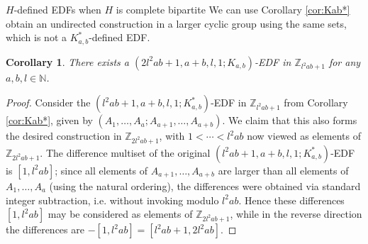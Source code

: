 \documentclass[12pt, a4paper]{article}
\newtheorem{corollary}[theorem]{Corollary}
\theoremstyle{definition}
\begin{document}
\begin{section}{$H$-defined EDFs when $H$ is complete bipartite}
We can use Corollary \ref{cor:Kab*} obtain an undirected construction in a larger cyclic group using the same sets, which is not a $K_{a,b}^*$-defined EDF.

\begin{corollary}
There exists a $(2l^2 ab+1, a+b,l,1; K_{a,b})$-EDF in $\mathbb{Z}_{l^2 ab+1}$ for any $a,b,l \in \mathbb{N}$.
\end{corollary}
\begin{proof}
Consider the $(l^2 ab+1,a+b,l,1; K_{a,b}^*)$-EDF in $\mathbb{Z}_{l^2 ab+1}$ from Corollary \ref{cor:Kab*}, given by $(A_1,\ldots,A_a; A_{a+1},\ldots, A_{a+b})$.  We claim that this also forms the desired construction in $\mathbb{Z}_{2l^2 ab+1}$, with $1< \cdots < l^2 ab$ now viewed as elements of $\mathbb{Z}_{2l^2 ab+1}$.  The difference multiset of the original $(l^2 ab+1,a+b,l,1; K_{a,b}^*)$-EDF is $[1,l^2 ab]$; since all elements of $A_{a+1},\ldots, A_{a+b}$ are larger than all elements of $A_1,\ldots,A_a$ (using the natural ordering), the differences were obtained via standard integer subtraction, i.e. without invoking modulo $l^2 ab$.  Hence these differences $[1,l^2 ab]$ may be considered as elements of $\mathbb{Z}_{2l^2 ab+1}$, while in the reverse direction the differences are $-[1,l^2ab]=[l^2 ab+1,2l^2 ab]$.
\end{proof}

\end{section}
\end{document}
